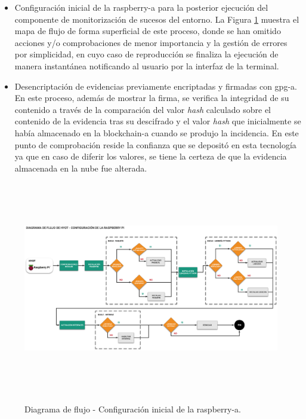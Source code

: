\documentclass[12pt,a4paper, twoside]{report}
\begin{document}
	\begin{itemize}
  		\item Configuración inicial de la \gls{raspberry-a} para la posterior ejecución del componente de monitorización de sucesos del entorno. La Figura \ref{fig:hyot_setupflow} muestra el mapa de flujo de forma superficial de este proceso, donde se han omitido acciones y/o comprobaciones de menor importancia  y la gestión de errores por simplicidad, en cuyo caso de reproducción se finaliza la ejecución de manera instantánea notificando al usuario por la interfaz de la terminal.
  		
  		\item Desencriptación de evidencias previamente encriptadas y firmadas con \gls{gpg-a}. En este proceso, además de mostrar la firma, se verifica la integridad de su contenido a través de la comparación del valor \textit{hash} calculado sobre el contenido de la evidencia tras su descifrado y el valor \textit{hash} que inicialmente se había almacenado en la \gls{blockchain-a} cuando se produjo la incidencia. En este punto de comprobación reside la confianza que se depositó en esta tecnología ya que en caso de diferir los valores, se tiene la certeza de que la evidencia almacenada en la nube fue alterada. %
	\end{itemize}
	
	\begin{figure}[!ht]   
		\caption{Diagrama de flujo - Configuración inicial de la \gls{raspberry-a}.} 
		\begin{center} 
	 		\includegraphics[width=17cm,height=9.3cm]{Images/implement/hyot_setupflow} \\
			\label{fig:hyot_setupflow} 
		\end{center}  
	\end{figure}
		
\end{document}
